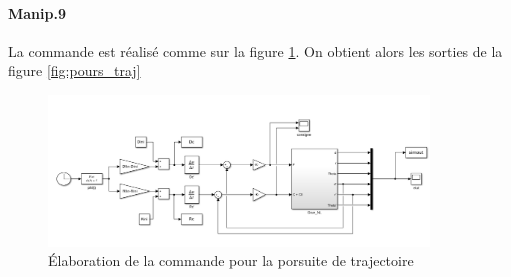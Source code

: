 \documentclass[10pt,a4paper,notitlepage]{article}
\begin{document}
\paragraph{Manip.9}
La commande est réalisé comme sur la figure \ref{fig:schemNL}. On
obtient alors les sorties de la figure \ref{fig:pours_traj}
\begin{figure}[H]
  \centering
  \includegraphics[width=0.9\textwidth]{boucleNL.png}
  \caption{Élaboration de la commande pour la porsuite de trajectoire}
  \label{fig:schemNL}
\end{figure}
\end{document}
